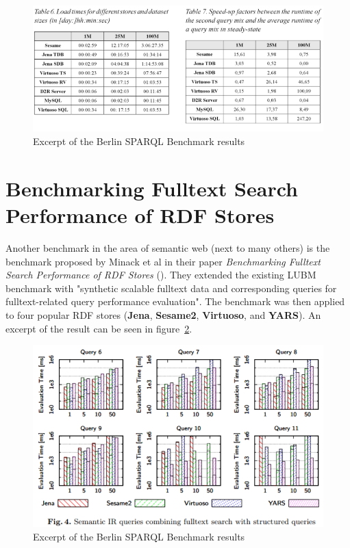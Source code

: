 \begin{figure}[htbp]
	\centering
\includegraphics[width=\textwidth]{img/bsbm_sample.png}
	\caption{Excerpt of the Berlin SPARQL Benchmark results}
	\label{bsbm_sample}
\end{figure}

\section{Benchmarking Fulltext Search Performance of RDF Stores}

Another benchmark in the area of semantic web (next to many others) is the 
benchmark proposed by Minack et al in their paper \textit{Benchmarking Fulltext 
Search Performance of RDF Stores} (\cite{minack2009benchmarking}). They extended 
the existing LUBM benchmark with "synthetic scalable fulltext data and 
corresponding queries for fulltext-related query performance evaluation". The 
benchmark was then applied to four popular RDF stores (\textbf{Jena}, 
\textbf{Sesame2}, \textbf{Virtuoso}, and \textbf{YARS}). An excerpt of the result 
can be seen in figure~\ref{minack_sample}.

\begin{figure}[htbp]
	\centering
\includegraphics[width=\textwidth]{img/minack_sample.png}
	\caption{Excerpt of the Berlin SPARQL Benchmark results}
	\label{minack_sample}
\end{figure}